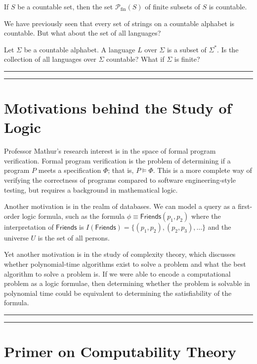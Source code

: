 \documentclass[11pt,usenames, dvipsnames]{article}
\begin{document}
\begin{theorem}
  If $S$ be a countable set, then the set $\mathscr{P}_{\text{fin}}{(S)}$ of finite subsets of $S$ is countable.
\end{theorem}

We have previously seen that every set of strings on a countable alphabet is countable. But what about the set of all languages?

\begin{question}
  Let $\Sigma$ be a countable alphabet. A language $L$ over $\Sigma$ is a subset of $\Sigma^*$. Is the collection of all languages over $\Sigma$ countable? What if $\Sigma$ is finite?
\end{question}

\vspace{5truemm}
\hrule
\hrule

\section*{\large \centering Motivations behind the Study of Logic}
\noindent

Professor Mathur's research interest is in the space of formal program verification. Formal program verification is the problem of determining if a program $P$ meets a specification $\Phi$; that is, $P \models \Phi$. This is a more complete way of verifying the correctness of programs compared to software engineering-style testing, but requires a background in mathematical logic.

Another motivation is in the realm of databases. We can model a query as a first-order logic formula, such as the formula $\phi \equiv \mathsf{Friends}(p_1, p_2)$ where the interpretation of $\mathsf{Friends}$ is $I(\mathsf{Friends}) = \{(p_1, p_2), (p_2, p_3), \ldots \}$ and the universe $U$ is the set of all persons.

Yet another motivation is in the study of complexity theory, which discusses whether polynomial-time algorithms exist to solve a problem and what the best algorithm to solve a problem is. If we were able to encode a computational problem as a logic formulae, then determining whether the problem is solvable in polynomial time could be equivalent to determining the satisfiability of the formula.

\vspace{5truemm}
\hrule
\hrule

\section*{\large \centering Primer on Computability Theory}
\noindent
\end{document}
